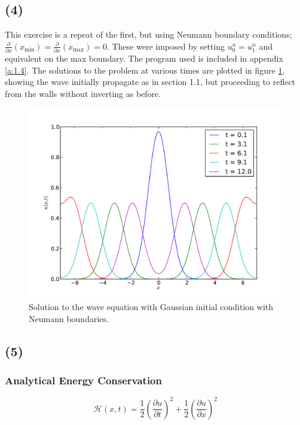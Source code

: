\documentclass[10pt]{article}
\begin{document}
\subsection*{(4)}
This exercise is a repeat of the first, but using Neumann boundary conditions;
$\frac{\partial}{\partial x}(x_\text{min}) = \frac{\partial}{\partial x}(x_\text{max})
= 0$.
These were imposed by setting $u_0 ^n = u_1^n$ and equivalent on the max boundary.
The program used is included in appendix \ref{a:1.4}.
The solutions to the problem at various times are plotted in figure \ref{f:neumann},
showing the wave initially propagate as in section 1.1, but proceeding to reflect
from the walls without inverting as before.
\begin{figure}
  \centering
  \includegraphics[width=\textwidth]{1/neumann.pdf}
  \caption{Solution to the wave equation with Gaussian initial condition
           with Neumann boundaries.}
  \label{f:neumann}
\end{figure}


\clearpage
\subsection*{(5)}
\subsubsection*{Analytical Energy Conservation}
\begin{equation}
\mathcal{H}(x,t) = \frac{1}{2}\left( \frac{\partial u}{\partial t}\right)^2
+ \frac{1}{2}\left( \frac{\partial u}{\partial x}\right)^2
\label{e:hd}
\end{equation}
\end{document}
